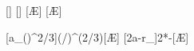 [\y]
[\y]
[\AE]
[\AE]

[a_\left(\right)^{2/3}]{\aErX*(\THaX/\TErX)^(2/3)}[\AE]
[2a-r_]{2*\aHaX-\rPHX}[\AE]
